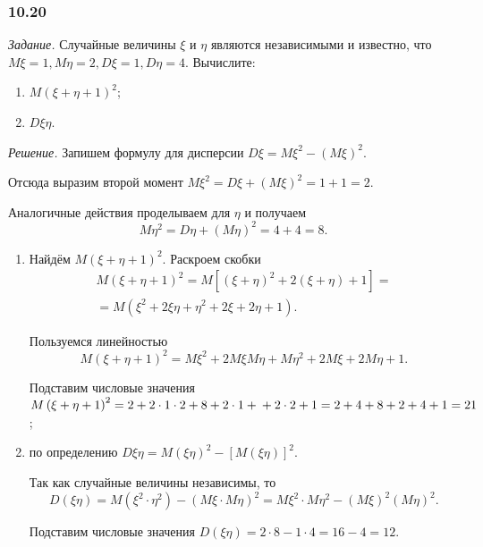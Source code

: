 \subsubsection*{10.20}

\textit{Задание.} Случайные величины $ \xi $ и $ \eta $ являются независимыми и известно, что $M \xi = 1, M \eta = 2, D \xi = 1, D \eta = 4$.
Вычислите:
\begin{enumerate}[label=\alph*)]
\item $M \left( \xi + \eta + 1 \right)^2$;
\item $D \xi \eta $.
\end{enumerate}

\textit{Решение.} Запишем формулу для дисперсии $D \xi = M \xi^2 - \left( M \xi \right)^2$.

Отсюда выразим второй момент $M \xi^2 = D \xi + \left( M \xi \right)^2 = 1 + 1 = 2$.

Аналогичные действия проделываем для $ \eta $ и получаем
$$M \eta^2 =
D \eta + \left( M \eta \right)^2 =
4 + 4 =
8.$$

\begin{enumerate}[label=\alph*)]
\item Найдём $M \left( \xi + \eta + 1 \right)^2$.
Раскроем скобки
\begin{equation*}
\begin{split}
M \left( \xi + \eta + 1 \right)^2 =
M \left[ \left( \xi + \eta \right)^2 + 2 \left( \xi + \eta \right) + 1 \right] = \\
= M \left( \xi^2 + 2 \xi \eta + \eta^2 + 2 \xi + 2 \eta + 1 \right).
\end{split}
\end{equation*}

Пользуемся линейностью
$$M \left( \xi + \eta + 1 \right)^2 =
M \xi^2 + 2 M \xi M \eta + M \eta^2 + 2M \xi + 2M \eta + 1.$$

Подставим числовые значения $M \left( \xi + \eta + 1 \right)^2 = 2 + 2 \cdot 1 \cdot 2 + 8 + 2 \cdot 1 + \\
+ 2 \cdot 2 + 1 = 2 + 4 + 8 + 2 + 4 + 1 = 21$;
\item по определению $D \xi \eta = M \left( \xi \eta \right)^2 - \left[ M \left( \xi \eta \right) \right]^2$.

Так как случайные величины независимы, то
$$D \left( \xi \eta \right) =
M \left( \xi^2 \cdot \eta^2 \right) - \left( M \xi \cdot M \eta \right)^2 =
M \xi^2 \cdot M \eta^2 - \left( M \xi \right)^2 \left( M \eta \right)^2.$$

Подставим числовые значения $D \left( \xi \eta \right) = 2 \cdot 8 - 1 \cdot 4 = 16 - 4 = 12$.
\end{enumerate}

